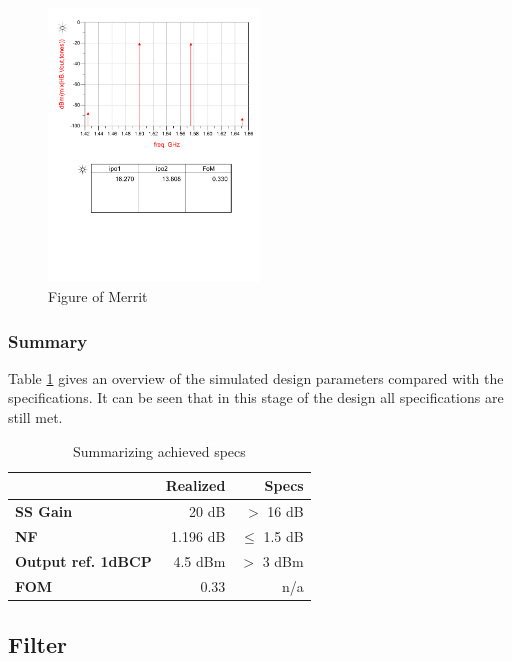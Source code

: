 \documentclass[a4paper]{article}        %
\begin{document}
			\begin{figure}[H]
				\centering
				\includegraphics[width=0.5\textwidth]{fig/LNA/fom.pdf}
				\caption{Figure of Merrit}
				\label{fig:lna_fom}
			\end{figure}

		\subsubsection{Summary}
			Table \ref{tab:lna_summ} gives an overview of the simulated design parameters compared with the specifications. It can be seen that in this stage of the design all specifications are still met.  

			\begin{table}[H]
			\centering
			\begin{tabular}{|l|r|r|}
				\hline
				 & \textbf{Realized} & \textbf{Specs} \\
				\hline
				\textbf{SS Gain} & 20 dB & $>$ 16 dB \\
				\hline
				\textbf{NF} & 1.196 dB & $\leq$ 1.5 dB \\
				\hline
				\textbf{Output ref. 1dBCP} & 4.5 dBm & $>$ 3 dBm \\
				\hline
				\textbf{FOM} & 0.33 & n/a \\
				\hline
			\end{tabular}
			\caption{Summarizing achieved specs}
			\label{tab:lna_summ}
			\end{table}

		
	\subsection{Filter}
\end{document}
